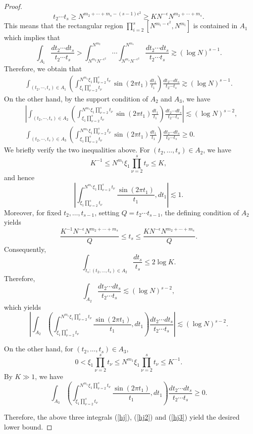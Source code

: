 \documentclass[11 pt,letterpaper]{amsart}
\theoremstyle{plain}
\theoremstyle{definition}
\theoremstyle{remark} \theoremstyle{exam} \theoremstyle{ob}
\numberwithin{equation}{section}
\begin{document}
\begin{proof}
$$t_2\cdots t_s
\ge N^{m_2+\cdots+m_s-(s-1)\epsilon^2}
\ge K N^{-\epsilon}N^{m_2+\cdots+m_s}.$$ This means that  the rectangular region
$
\prod_{i=2}^{s}[N^{m_i-\epsilon^2},N^{m_i}]
$
is contained in $A_1$ which implies that  $$\int_{A_1}\frac{d t_2\cdots dt_s}{t_2\cdots t_s}> \int_{N^{m_2}N^{-\epsilon^2}}^{N^{m_2}}\cdots\int_{N^{m_s}N^{-\epsilon^2}}^{N^{m_s}}  \frac{dt_2\cdots dt_s}{t_2\cdots t_s}  \gtrsim (\log N)^{s-1}.$$ Therefore, we obtain that
\begin{align}\label{hj}
	 \int_{(t_2,\cdots,t_s)\in A_1}   \left( \int_{\xi_1 \prod_{\nu=2}^s t_\nu  }^{N^{m_1}\xi_1 \prod_{\nu=2}^s t_\nu }\sin(2\pi t_1 ) \frac{dt_1}{t_1}\right) \frac{dt_2\cdots dt_s}{t_2\cdots t_s}\gtrsim (\log N)^{s-1}.
\end{align}
On the other hand, by the support condition of $A_2$ and $A_3$, we have
\begin{align}
&\left| \int_{(t_2,\cdots,t_s)\in A_2}   \left( \int_{\xi_1 \prod_{\nu=2}^s t_\nu  }^{N^{m_1}\xi_1 \prod_{\nu=2}^s t_\nu }\sin(2\pi t_1 ) \frac{dt_1}{t_1}\right) \frac{dt_2\cdots dt_s}{t_2\cdots t_s}\right|\lesssim (\log N)^{s-2},\label{hj2}\\
& \int_{(t_2,\cdots,t_s)\in A_3}   \left( \int_{\xi_1 \prod_{\nu=2}^s t_\nu  }^{N^{m_1}\xi_1 \prod_{\nu=2}^s t_\nu }\sin(2\pi t_1 ) \frac{dt_1}{t_1}\right) \frac{dt_2\cdots dt_s}{t_2\cdots t_s}\ge 0.\label{hj3}
\end{align}
We briefly verify the two inequalities above. For $(t_2,\dots,t_s)\in A_2$, we have
$$
K^{-1}\le N^{m_1}\xi_1\prod_{\nu=2}^s t_\nu\le K,
$$
and hence
$$
\left|
\int_{\xi_1\prod_{\nu=2}^s t_\nu}^{N^{m_1}\xi_1\prod_{\nu=2}^s t_\nu}
\frac{\sin(2\pi t_1)}{t_1},dt_1
\right|
\lesssim 1.
$$
Moreover, for fixed $t_2,\dots,t_{s-1}$, setting $Q=t_2\cdots t_{s-1}$, the defining condition of $A_2$ yields
$$
\frac{K^{-1}N^{-\epsilon}N^{m_2+\cdots+m_s}}{Q}
\le t_s\le
\frac{KN^{-\epsilon}N^{m_2+\cdots+m_s}}{Q}.
$$
Consequently,
$$
\int_{{t_s:(t_2,\dots,t_s)\in A_2}}\frac{dt_s}{t_s}
\le 2\log K.
$$ Therefore,
$$
\int_{A_2}\frac{dt_2\cdots dt_s}{t_2\cdots t_s}
\lesssim (\log N)^{s-2},
$$
which yields
$$
\left|
\int_{A_2}
\left(
\int_{\xi_1\prod_{\nu=2}^s t_\nu}^{N^{m_1}\xi_1\prod_{\nu=2}^s t_\nu}
\frac{\sin(2\pi t_1)}{t_1},dt_1
\right)
\frac{dt_2\cdots dt_s}{t_2\cdots t_s}
\right|
\lesssim (\log N)^{s-2}.
$$

On the other hand, for $(t_2,\dots,t_s)\in A_3$,
$$
0<
\xi_1\prod_{\nu=2}^s t_\nu
\le
N^{m_1}\xi_1\prod_{\nu=2}^s t_\nu
\le K^{-1}.
$$
By $K\gg 1$, we have 
$$
\int_{A_3}
\left(
\int_{\xi_1\prod_{\nu=2}^s t_\nu}^{N^{m_1}\xi_1\prod_{\nu=2}^s t_\nu}
\frac{\sin(2\pi t_1)}{t_1},dt_1
\right)
\frac{dt_2\cdots dt_s}{t_2\cdots t_s}
\ge0.
$$




Therefore, the above three integrals (\ref{hj}), (\ref{hj2}) and (\ref{hj3}) yield the desired lower bound.
\end{proof}
\end{document}
